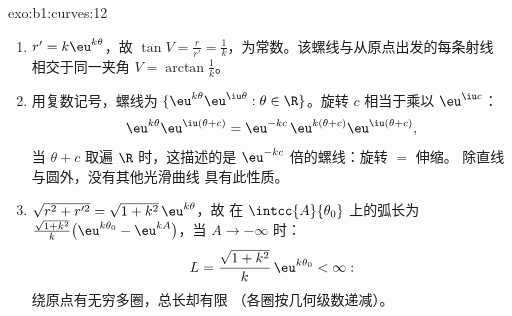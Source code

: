\begin{solution}{exo:b1:curves:12}
\begin{enumerate}
  \item $r' = k\eu^{k\theta}$，故 $\tan V = \frac{r}{r'} =
        \frac1k$，为常数。该螺线与从原点出发的每条射线
        相交于同一夹角 $V = \arctan\frac1k$。
  \item 用复数记号，螺线为 $\{\eu^{k\theta}
        \eu^{\iu\theta} : \theta \in \R\}$。旋转 $c$
        相当于乘以 $\eu^{\iu c}$：
        \[
        \eu^{k\theta}\eu^{\iu(\theta + c)}
        = \eu^{-kc}\,\eu^{k(\theta + c)}\eu^{\iu(\theta+c)} ,
        \]
        当 $\theta + c$ 取遍 $\R$ 时，这描述的是
        $\eu^{-kc}$ 倍的螺线：旋转 $=$ 伸缩。
        除直线与圆外，没有其他光滑曲线
        具有此性质。
  \item $\sqrt{r^2 + r'^2} = \sqrt{1 + k^2}\,\eu^{k\theta}$，故
        在 $\intcc{A}{\theta_0}$ 上的弧长为
        $\frac{\sqrt{1+k^2}}{k}\bigl(\eu^{k\theta_0} -
        \eu^{kA}\bigr)$，当 $A \to -\infty$ 时：
        \[
        L = \frac{\sqrt{1 + k^2}}{k}\,\eu^{k\theta_0} < \infty :
        \]
        绕原点有无穷多圈，总长却有限
        （各圈按几何级数递减）。
\end{enumerate}
\end{solution}

